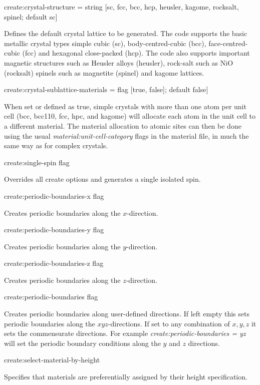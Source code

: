 {\zicf create:crystal-structure = string [sc, fcc, bcc, hcp, heusler, kagome, rocksalt, spinel; default sc]} Defines the default crystal lattice to be generated. The code supports the basic metallic crystal types simple cubic (sc), body-centred-cubic (bcc), face-centred-cubic (fcc) and hexagonal close-packed (hcp). The code also supports important magnetic structures such as Heusler alloys (heusler), rock-salt such as NiO (rocksalt) spinels such as magnetite (spinel) and kagome lattices.

{\zicf create:crystal-sublattice-materials = flag [true, false]; default false]}  When set or defined as true, simple crystals with more than one atom per unit
cell (bcc, bcc110, fcc, hpc, and kagome) will allocate each atom in the unit cell to a different material. The material allocation to atomic sites can then be done using the usual \textit{material:unit-cell-category} flags in the material file, in much the same way as for complex crystals.

{\zicf create:single-spin flag} Overrides all create options and generates a single isolated spin.

{\zicf create:periodic-boundaries-x flag} Creates periodic boundaries along the $x$-direction.

{\zicf create:periodic-boundaries-y flag} Creates periodic boundaries along the $y$-direction.

{\zicf create:periodic-boundaries-z flag} Creates periodic boundaries along the $z$-direction.

{\zicf create:periodic-boundaries flag}
Creates periodic boundaries along user-defined directions. If left empty this sets
periodic boundaries along the $xyz$-directions. If set to any combination of $x,y,z$
it sets the commensurate directions. For example \textit{create:periodic-boundaries = yz}
will set the periodic boundary conditions along the $y$ and $z$ directions.

{\zicf create:select-material-by-height} Specifies that materials are preferentially assigned by their height specification.

